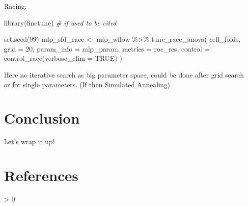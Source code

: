 \documentclass[
]{book}
\newenvironment{Shaded}{\begin{snugshade}}{\end{snugshade}}
\newcommand{\AttributeTok}[1]{\textcolor[rgb]{0.77,0.63,0.00}{#1}}
\newcommand{\CommentTok}[1]{\textcolor[rgb]{0.56,0.35,0.01}{\textit{#1}}}
\newcommand{\ConstantTok}[1]{\textcolor[rgb]{0.00,0.00,0.00}{#1}}
\newcommand{\DecValTok}[1]{\textcolor[rgb]{0.00,0.00,0.81}{#1}}
\newcommand{\FunctionTok}[1]{\textcolor[rgb]{0.00,0.00,0.00}{#1}}
\newcommand{\NormalTok}[1]{#1}
\newcommand{\OtherTok}[1]{\textcolor[rgb]{0.56,0.35,0.01}{#1}}
\newcommand{\SpecialCharTok}[1]{\textcolor[rgb]{0.00,0.00,0.00}{#1}}
\newlength{\cslhangindent}
\newenvironment{CSLReferences}[2] %
 {%
  \setlength{\parindent}{0pt}
  \ifodd #1 \everypar{\setlength{\hangindent}{\cslhangindent}}\ignorespaces\fi
  \ifnum #2 > 0
  \setlength{\parskip}{#2\baselineskip}
  \fi
 }%
 {}
\begin{document}
Racing:

\begin{Shaded}
\begin{Highlighting}[]
\FunctionTok{library}\NormalTok{(finetune) }\CommentTok{\# if used to be cited}

\FunctionTok{set.seed}\NormalTok{(}\DecValTok{99}\NormalTok{)}
\NormalTok{mlp\_sfd\_race }\OtherTok{\textless{}{-}}
\NormalTok{  mlp\_wflow }\SpecialCharTok{\%\textgreater{}\%}
  \FunctionTok{tune\_race\_anova}\NormalTok{(}
\NormalTok{    cell\_folds,}
    \AttributeTok{grid =} \DecValTok{20}\NormalTok{,}
    \AttributeTok{param\_info =}\NormalTok{ mlp\_param,}
    \AttributeTok{metrics =}\NormalTok{ roc\_res,}
    \AttributeTok{control =} \FunctionTok{control\_race}\NormalTok{(}\AttributeTok{verbose\_elim =} \ConstantTok{TRUE}\NormalTok{)}
\NormalTok{  )}
\end{Highlighting}
\end{Shaded}

Here no iterative search as big parameter space, could be done after grid search or for single parameters. (If then Simulated Annealing)

\hypertarget{conclusion}{%
\chapter{Conclusion}\label{conclusion}}

Let's wrap it up!

\hypertarget{references}{%
\chapter{References}\label{references}}

\hypertarget{refs}{}
\begin{CSLReferences}{0}{0}
\end{CSLReferences}

  
\end{document}
